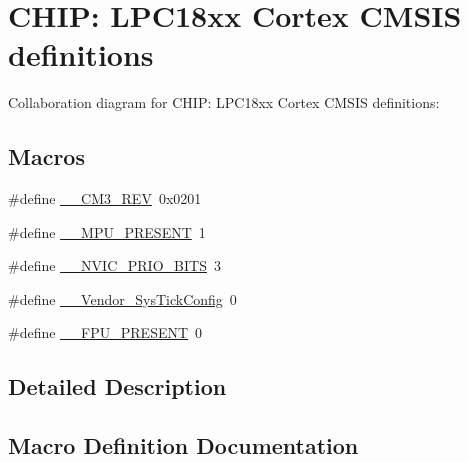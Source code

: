\hypertarget{group___c_m_s_i_s__18_x_x___c_o_m_m_o_n}{}\section{C\+H\+IP\+: L\+P\+C18xx Cortex C\+M\+S\+IS definitions}
\label{group___c_m_s_i_s__18_x_x___c_o_m_m_o_n}
Collaboration diagram for C\+H\+IP\+: L\+P\+C18xx Cortex C\+M\+S\+IS definitions\+:
\subsection*{Macros}
\begin{DoxyCompactItemize}
\item 
\#define \hyperlink{group___c_m_s_i_s__18_x_x___c_o_m_m_o_n_gac6a3f185c4640e06443c18b3c8d93f53}{\+\_\+\+\_\+\+C\+M3\+\_\+\+R\+EV}~0x0201
\item 
\#define \hyperlink{group___c_m_s_i_s__18_x_x___c_o_m_m_o_n_ga4127d1b31aaf336fab3d7329d117f448}{\+\_\+\+\_\+\+M\+P\+U\+\_\+\+P\+R\+E\+S\+E\+NT}~1
\item 
\#define \hyperlink{group___c_m_s_i_s__18_x_x___c_o_m_m_o_n_gae3fe3587d5100c787e02102ce3944460}{\+\_\+\+\_\+\+N\+V\+I\+C\+\_\+\+P\+R\+I\+O\+\_\+\+B\+I\+TS}~3
\item 
\#define \hyperlink{group___c_m_s_i_s__18_x_x___c_o_m_m_o_n_gab58771b4ec03f9bdddc84770f7c95c68}{\+\_\+\+\_\+\+Vendor\+\_\+\+Sys\+Tick\+Config}~0
\item 
\#define \hyperlink{group___c_m_s_i_s__18_x_x___c_o_m_m_o_n_gac1ba8a48ca926bddc88be9bfd7d42641}{\+\_\+\+\_\+\+F\+P\+U\+\_\+\+P\+R\+E\+S\+E\+NT}~0
\end{DoxyCompactItemize}


\subsection{Detailed Description}


\subsection{Macro Definition Documentation}
\mbox{\label{group___c_m_s_i_s__18_x_x___c_o_m_m_o_n_gac6a3f185c4640e06443c18b3c8d93f53}} 
